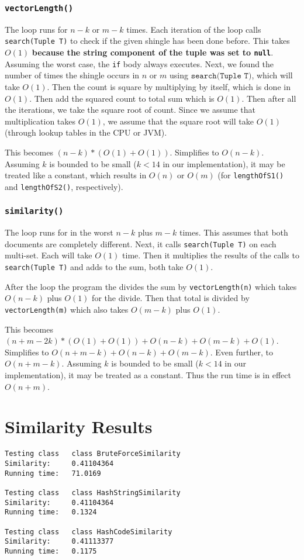 \documentclass[10pt,letterpaper]{article}
\begin{document}
\subsubsection{\texttt{vectorLength()}}
The loop runs for $n-k$ or $m-k$ times. Each iteration of the loop calls \texttt{search(Tuple T)} to check if the given shingle has been done before. This takes $O(1)$ \textbf{because the string component of the tuple was set to \texttt{null}}. Assuming the worst case, the \texttt{if} body always executes. Next, we found the number of times the shingle occurs in $n$ or $m$ using $ \texttt{search(Tuple T)}$, which will take $O(1)$. Then the count is square by multiplying by itself, which is done in $O(1)$. Then add the squared count to total sum which is $O(1)$. Then after all the iterations, we take the square root of count. Since we assume that multiplication takes $O(1)$, we assume that the square root will take $O(1)$ (through lookup tables in the CPU or JVM).

This becomes $(n-k)*(O(1)+O(1))$. Simplifies to $O(n-k)$. Assuming $k$ is bounded to be small ($k<14$ in our implementation), it may be treated like a constant, which results in $O(n)$ or $O(m)$ (for \texttt{lengthOfS1()} and \texttt{lengthOfS2()}, respectively).
\subsubsection{\texttt{similarity()}}
The loop runs for in the worst $n-k$ plus $m-k$ times. This assumes that both documents are completely different. Next, it calls \texttt{search(Tuple T)} on each multi-set. Each will take $O(1)$ time. Then it multiplies the results of the calls to \texttt{search(Tuple T)} and adds to the sum, both take $O(1)$.

After the loop the program the divides the sum by \texttt{vectorLength(n)} which takes $O(n-k)$ plus $O(1)$ for the divide. Then that total is divided by \texttt{vectorLength(m)} which also takes $O(m-k)$ plus $O(1)$.

This becomes $(n+m-2k)*(O(1)+O(1))+O(n-k)+O(m-k)+O(1)$. Simplifies to $O(n+m-k)+O(n-k)+O(m-k)$. Even further, to $O(n+m-k)$. Assuming $k$ is bounded to be small ($k<14$ in our implementation), it may be treated as a constant. Thus the run time is in effect $O(n+m)$.
\section{Similarity Results}
\begin{verbatim}
Testing class   class BruteForceSimilarity
Similarity:     0.41104364
Running time:   71.0169

Testing class   class HashStringSimilarity
Similarity:     0.41104364
Running time:   0.1324

Testing class   class HashCodeSimilarity
Similarity:     0.41113377
Running time:   0.1175
\end{verbatim}
\end{document}
